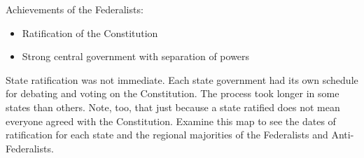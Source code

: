 Achievements of the Federalists:

\begin{itemize}
    \item Ratification of the Constitution
    \item Strong central government with separation of powers
\end{itemize}

State ratification was not immediate. Each state government had its own schedule
for debating and voting on the Constitution. The process took longer in some
states than others. Note, too, that just because a state ratified does not mean
everyone agreed with the Constitution. Examine this map to see the dates of
ratification for each state and the regional majorities of the Federalists and
Anti-Federalists.

\newpage
